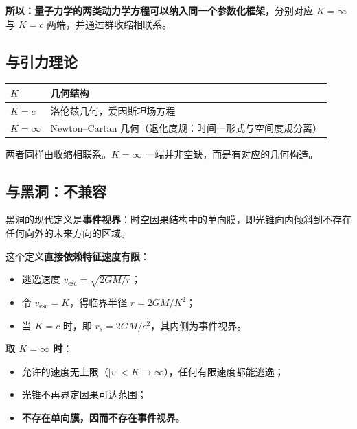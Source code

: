 \documentclass[
  chinese,
  a4paper,
  UTF8,
  12pt,
  oneside,
  openany]{ctexbook}
\newcounter{none} %
\providecommand{\tightlist}{%
  \setlength{\itemsep}{0pt}\setlength{\parskip}{0pt}}
\theoremstyle{plain}
\theoremstyle{plain}
\theoremstyle{plain}
\theoremstyle{definition}
\theoremstyle{plain}
\theoremstyle{plain}
\theoremstyle{remark}
\begin{document}
\textbf{所以：量子力学的两类动力学方程可以纳入同一个参数化框架}，分别对应
\(K=\infty\) 与 \(K=c\) 两端，并通过群收缩相联系。

\subsection{与引力理论}\label{ux4e0eux5f15ux529bux7406ux8bba}

{\def\LTcaptype{none} %
\begin{longtable}[]{@{}
  >{\raggedright\arraybackslash}p{}
  >{\raggedright\arraybackslash}p{}@{}}
\toprule\noalign{}
\begin{minipage}[b]{\linewidth}\raggedright
\(K\)
\end{minipage} & \begin{minipage}[b]{\linewidth}\raggedright
几何结构
\end{minipage} \\
\midrule\noalign{}
\endhead
\bottomrule\noalign{}
\endlastfoot
\(K=c\) & 洛伦兹几何，爱因斯坦场方程 \\
\(K=\infty\) & Newton--Cartan
几何（退化度规：时间一形式与空间度规分离） \\
\end{longtable}
}

两者同样由收缩相联系。\(K=\infty\) 一端并非空缺，而是有对应的几何构造。

\subsection{与黑洞：不兼容}\label{ux4e0eux9ed1ux6d1eux4e0dux517cux5bb9}

黑洞的现代定义是\textbf{事件视界}：时空因果结构中的单向膜，即光锥向内倾斜到不存在任何向外的未来方向的区域。

这个定义\textbf{直接依赖特征速度有限}：

\begin{itemize}
\tightlist
\item
  逃逸速度 \(v_{\text{esc}}=\sqrt{2GM/r}\)；
\item
  令 \(v_{\text{esc}}=K\)，得临界半径 \(r=2GM/K^{2}\)；
\item
  当 \(K=c\) 时，即 \(r_s=2GM/c^{2}\)，其内侧为事件视界。
\end{itemize}

\textbf{取 \(K=\infty\) 时}：

\begin{itemize}
\tightlist
\item
  允许的速度无上限（\(|v|<K\to\infty\)），任何有限速度都能逃逸；
\item
  光锥不再界定因果可达范围；
\item
  \textbf{不存在单向膜，因而不存在事件视界}。
\end{itemize}
\end{document}
